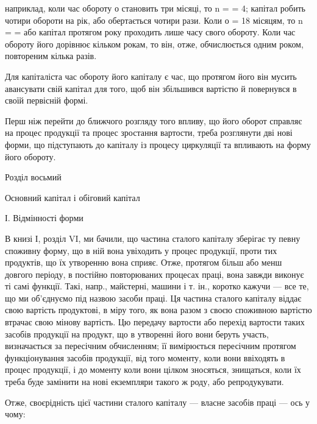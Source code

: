 \parcont{}  %
наприклад, коли час обороту о становить три місяці, то n =  = 4; капітал
робить чотири обороти на рік, або обертається чотири рази.
Коли о = 18 місяцям, то n =  =  або капітал протягом року проходить
лише  часу свого обороту. Коли час обороту його дорівнює кільком
рокам, то він, отже, обчислюється одним роком, повтореним кілька
разів.

Для капіталіста час обороту його капіталу є час, що протягом його він
мусить авансувати свій капітал для того, щоб він збільшився вартістю
й повернувся в своїй первісній формі.

Перш ніж перейти до ближчого розгляду того впливу, що його
оборот справляє на процес продукції та процес зростання вартости, треба
розглянути дві нові форми, що підступають до капіталу із процесу циркуляції
та впливають на форму його обороту.

Розділ восьмий

Основний капітал і обіговий капітал

І. Відмінності форми

В книзі І, розділ VI, ми бачили, що частина сталого капіталу зберігає
ту певну споживну форму, що в ній вона увіходить у процес
продукції, проти тих продуктів, що їх утворенню вона сприяє. Отже,
протягом більш або менш довгого періоду, в постійно повторюваних
процесах праці, вона завжди виконує ті самі функції. Такі, напр., майстерні,
машини і т. ін., коротко кажучи — все те, що ми об’єднуємо
під назвою засоби праці. Ця частина сталого капіталу віддає свою
вартість продуктові, в міру того, як вона разом з своєю споживною
вартістю втрачає свою мінову вартість. Цю передачу вартости або перехід
вартости таких засобів продукції на продукт, що в утворенні його
вони беруть участь, визначається за пересічним обчисленням; її вимірюється
пересічним протягом функціонування засобів продукції, від
того моменту, коли вони ввіходять в процес продукції, і до моменту
коли вони цілком зносяться, знищаться, коли їх треба буде замінити на
нові екземпляри такого ж роду, або репродукувати.

Отже, своєрідність цієї частини сталого капіталу — власне засобів
праці — ось у чому:

